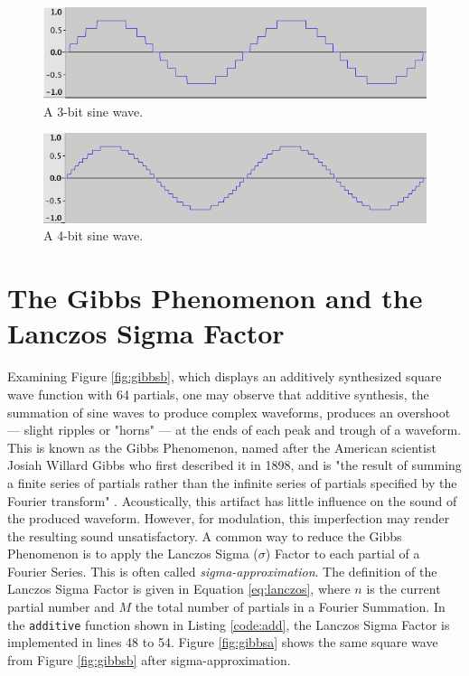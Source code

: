 \begin{figure}[th!]
  \includegraphics[scale=0.5]{img/sine3}
  \caption{A 3-bit sine wave.}
  \label{fig:sine3}
\end{figure}

\begin{figure}[th!]
  \includegraphics[scale=0.5]{img/sine4}
  \caption{A 4-bit sine wave.}
  \label{fig:sine4}
\end{figure}

\pagebreak

\section{The Gibbs Phenomenon and the Lanczos Sigma Factor}

Examining Figure \ref{fig:gibbsb}, which displays an additively synthesized square wave function with 64 partials, one may observe that additive synthesis, the summation of sine waves to produce complex waveforms, produces an overshoot --- slight ripples or "horns" --- at the ends of each peak and trough of a waveform. This is known as the Gibbs Phenomenon, named after the American scientist Josiah Willard Gibbs who first described it in 1898, and is "the result of summing a finite series of partials rather than the infinite series of partials specified by the Fourier transform" . Acoustically, this artifact has little influence on the sound of the produced waveform. However, for modulation, this imperfection may render the resulting sound unsatisfactory. A common way to reduce the Gibbs Phenomenon is to apply the Lanczos Sigma ($\sigma$) Factor to each partial of a Fourier Series. This is often called \emph{sigma-approximation}. The definition of the Lanczos Sigma Factor is given in Equation \ref{eq:lanczos}, where $n$ is the current partial number and $M$ the total number of partials in a Fourier Summation. In the \texttt{additive} function shown in Listing \ref{code:add}, the Lanczos Sigma Factor is implemented in lines 48 to 54. Figure \ref{fig:gibbsa} shows the same square wave from Figure \ref{fig:gibbsb} after sigma-approximation.

